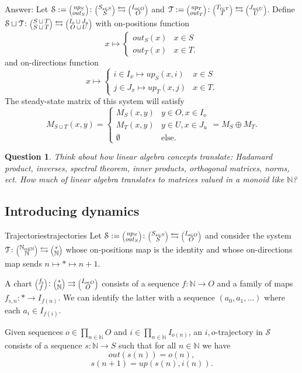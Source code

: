 \documentclass[12pt, a4paper]{article}
\theoremstyle{definition}
\theoremstyle{plain}
\theoremstyle{plain}
\theoremstyle{plain}
\theoremstyle{plain}
\newtheorem{question}[counter]{Question}
\theoremstyle{plain}
\theoremstyle{remark}
\theoremstyle{remark}
\newcommand{\mc}[1]{\mathcal{#1}}
\newcommand{\lens}[2]{\scaleobj{0.6}{\begin{pmatrix} \scaleobj{1.3}{{#1}} \\ \scaleobj{1.3}{{#2}} \end{pmatrix}}}
\begin{document}
Answer: Let $\mc{S} := \lens{up_S}{out_S} \colon \lens{S_{s \in S}}{S} \leftrightarrows \lens{I_{o \in O}}{O}$ and $\mc{T} := \lens{up_T}{out_T} \colon \lens{T_{t \in T}}{T} \leftrightarrows \lens{J_{u \in U}}{U}$. Define $\mc{S} \sqcup \mc{T} \colon \lens{S \sqcup T}{S \sqcup T} \leftrightarrows \lens{I_o \sqcup J_u}{O \sqcup U}$ with on-positions function 
$$x \mapsto \begin{cases} out_S(x) & x \in S \\ out_T(x) & x \in T. \end{cases}$$ 
and on-directions function 
$$ x \mapsto \begin{cases} i \in I_x \mapsto up_S(x,i) & x \in S \\ j \in J_x \mapsto up_T(x,j) & x \in T. \end{cases}$$
The steady-state matrix of this system will satisfy 
$$M_{S \sqcup T}(x,y) = \begin{cases} M_S(x,y) & y \in O, x \in I_o \\  M_T(x,y) & y \in U, x \in J_u \\ \emptyset & \text{else.} \end{cases} = M_S \oplus M_T.$$

\begin{question}
	Think about how linear algebra concepts translate: Hadamard product, inverses, spectral theorem, inner products, orthogonal matrices, norms, ect. How much of linear algebra translates to matrices valued in a monoid like $\mathbb{N}$?
\end{question}

\subsection{Introducing dynamics}

\begin{tcdefinition}{Trajectories}{trajectories}
	Let $\mc{S} := \lens{up_S}{out_S} \colon \lens{S_{s \in S}}{S} \leftrightarrows \lens{I_{o \in O}}{O}$ and consider the system $\mc{T} \colon \lens{\mathbb{N}_{n \in \mathbb{N}}}{\mathbb{N}} \leftrightarrows \lens{*}{\mathbb{N}}$ whose on-positions map is the identity and whose on-directions map sends $n \mapsto * \mapsto n+1$.

	A chart $\lens{f_\flat}{f} \colon \lens{*}{\mathbb{N}} \rightrightarrows \lens{I_{o \in O}}{O}$ consists of a sequence $f \colon \mathbb{N} \rightarrow O$ and a family of maps $f_{\flat,n} \colon * \rightarrow I_{f(n)}$. We can identify the latter with a sequence $(a_0, a_1, \ldots)$ where each $a_i \in I_{f(i)}$.

	Given sequences $o \in \prod_{n \in \mathbb{N}} O$ and $i \in \prod_{n \in \mathbb{N}} I_{o(n)}$, an $i,o$-trajectory in $\mc{S}$ consists of a sequence $s \colon \mathbb{N} \rightarrow S$ such that for all $n \in \mathbb{N}$ we have
	$$out(s(n)) = o(n), $$
	$$s(n+1) = up(s(n), i(n)).$$
\end{tcdefinition}
\end{document}

